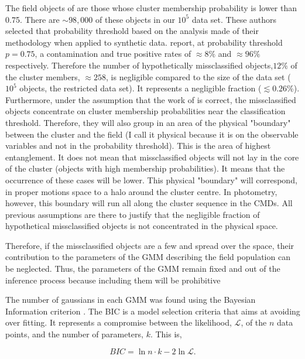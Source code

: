 The field objects of \citet{Bouy2015} are those whose cluster membership probability is lower than 0.75. There are $\sim 98,000$ of these objects in our $10^5$ data set. These authors selected that probability threshold based on the analysis \citet{Sarro2014} made of their methodology when applied to synthetic data. \citet{Sarro2014} report, at probability threshold $p=0.75$, a contamination and true positive rates of $\approx 8\%$ and $ \approx96\%$ respectively. Therefore the number of hypothetically missclassified objects,$12\%$ of the cluster members, $\approx 258 $, is negligible compared to the size of the data set ($10^5$ objects, the restricted data set). It represents a negligible fraction ($ \lesssim0.26$\%). Furthermore, under the assumption that the work of \citet{Sarro2014} is correct, the missclassified objects concentrate on cluster membership probabilities near the classification threshold. Therefore, they will also group in an area of the physical "boundary" between the cluster and the field (I call it physical because it is on the observable variables and not in the probability threshold). This is the area of highest entanglement. It does not mean that missclassified objects will not lay in the core of the cluster (objects with high membership probabilities). It means that the occurrence of these cases will be lower.  This physical "boundary" will correspond, in proper motions space to a halo around the cluster centre. In photometry, however, this boundary will run all along the cluster sequence in the CMDs. All previous assumptions are there to justify that the negligible fraction of hypothetical missclassified  objects is not concentrated in the physical space. 

Therefore, if the missclassified objects are a few and spread over the space, their contribution to the parameters of the GMM describing the field population can be neglected. Thus, the parameters of the GMM remain fixed and out of the inference process because including them will be prohibitive

The number of gaussians in each GMM was found using the Bayesian Information criterion \cite[BIC,][]{Schwarz1978}. The BIC is a model selection criteria that aims at avoiding over fitting. It represents a compromise between the likelihood, $\mathcal{L}$, of the $n$ data points, and the number of parameters, $k$. This is,

\begin{equation}
\label{eq:BIC}
BIC = \ln{n}\cdot k - 2 \ln{\mathcal{L}}.
\end{equation}

